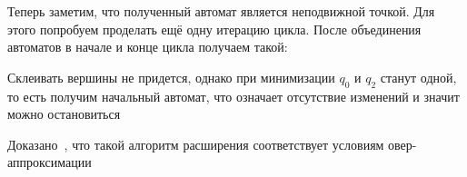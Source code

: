 Теперь заметим, что полученный автомат является неподвижной точкой. Для этого попробуем проделать ещё одну итерацию цикла. После объединения автоматов в начале и конце цикла получаем такой:

\begin{figure}[h]
    \centering
\end{figure}

Склеивать вершины не придется, однако при минимизации $q_0$ и $q_2$ станут одной, то есть получим начальный автомат, что означает отсутствие изменений и значит можно остановиться 

Доказано~\cite{widening}, что такой алгоритм расширения соответствует условиям овер-аппроксимации